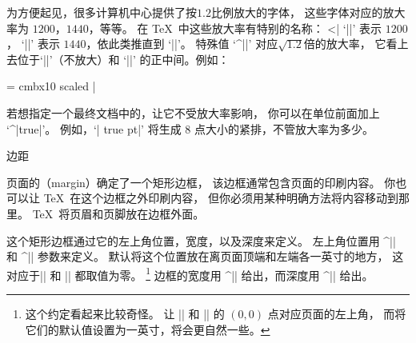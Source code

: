 {{{{{%
%
为方便起见，很多计算机中心提供了按$1.2$比例放大的字体，
这些字体对应的放大率为 $1200$，$1440$，等等。
在 \TeX\ 中这些放大率有特别的名称：
^^|\magstep|
`||' 表示 $1200$，
`||' 表示 $1440$，依此类推直到 `||'。
特殊值 `^|\magstephalf|' 对应$\sqrt{1.2}$倍的放大率，
它看上去位于`||'（不放大）和
`||' 的正中间。例如：

\csdisplay
\font\bigbold = cmbx10 scaled \magstephalf
|

若想指定一个最终文档中的，让它不受放大率影响，
你可以在单位前面加上 `^|true|'。
例如，`| true pt|' 将生成 $8$ 点大小的紧排，不管放大率为多少。

\endconcept

\concept 边距

页面的（margin）确定了一个矩形边框，
该边框通常包含页面的印刷内容。
你也可以让 \TeX\ 在这个边框之外印刷内容，
但你必须用某种明确方法将内容移动到那里。
\TeX\ 将页眉和页脚放在边框外面。

这个矩形边框通过它的左上角位置，宽度，以及深度来定义。
左上角位置用 ^|\hoffset| 和 ^|\voffset| \ctsref\voffset 参数来定义。
默认将这个位置放在离页面顶端和左端各一英寸的地方，
这对应于|\hoffset| 和 |\voffset| 都取值为零。%
\footnote{这个约定看起来比较奇怪。
让 |\hoffset| 和 |\voffset| 的 $(0,0)$ 点对应页面的左上角，
而将它们的默认值设置为一英寸，将会更自然一些。}
边框的宽度用 ^|\hsize| 给出，而深度用 ^|\vsize| 给出。

}}}}}
